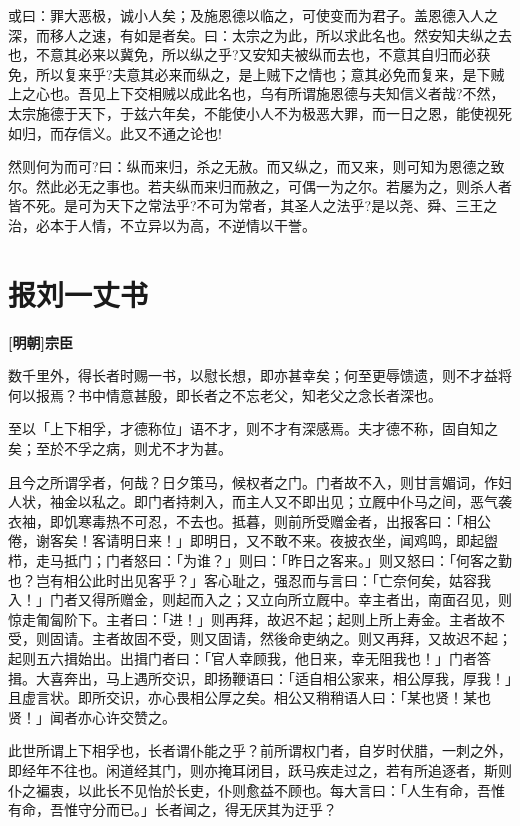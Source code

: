 \documentclass[UTF8,titlepage,oneside]{ctexbook}
\begin{document}
或曰：罪大恶极，诚小人矣；及施恩德以临之，可使变而为君子。盖恩德入人之深，而移人之速，有如是者矣。曰：太宗之为此，所以求此名也。然安知夫纵之去也，不意其必来以冀免，所以纵之乎?又安知夫被纵而去也，不意其自归而必获免，所以复来乎?夫意其必来而纵之，是上贼下之情也；意其必免而复来，是下贼上之心也。吾见上下交相贼以成此名也，乌有所谓施恩德与夫知信义者哉?不然，太宗施德于天下，于兹六年矣，不能使小人不为极恶大罪，而一日之恩，能使视死如归，而存信义。此又不通之论也!


然则何为而可?曰：纵而来归，杀之无赦。而又纵之，而又来，则可知为恩德之致尔。然此必无之事也。若夫纵而来归而赦之，可偶一为之尔。若屡为之，则杀人者皆不死。是可为天下之常法乎?不可为常者，其圣人之法乎?是以尧、舜、三王之治，必本于人情，不立异以为高，不逆情以干誉。



\chapter*{报刘一丈书}
\begin{center}
	\textbf{[明朝]宗臣}
\end{center}

数千里外，得长者时赐一书，以慰长想，即亦甚幸矣；何至更辱馈遗，则不才益将何以报焉？书中情意甚殷，即长者之不忘老父，知老父之念长者深也。

至以「上下相孚，才德称位」语不才，则不才有深感焉。夫才德不称，固自知之矣；至於不孚之病，则尤不才为甚。

且今之所谓孚者，何哉？日夕策马，候权者之门。门者故不入，则甘言媚词，作妇人状，袖金以私之。即门者持刺入，而主人又不即出见；立厩中仆马之间，恶气袭衣袖，即饥寒毒热不可忍，不去也。抵暮，则前所受赠金者，出报客曰：「相公倦，谢客矣！客请明日来！」即明日，又不敢不来。夜披衣坐，闻鸡鸣，即起盥栉，走马抵门；门者怒曰：「为谁？」则曰：「昨日之客来。」则又怒曰：「何客之勤也？岂有相公此时出见客乎？」客心耻之，强忍而与言曰：「亡奈何矣，姑容我入！」门者又得所赠金，则起而入之；又立向所立厩中。幸主者出，南面召见，则惊走匍匐阶下。主者曰：「进！」则再拜，故迟不起；起则上所上寿金。主者故不受，则固请。主者故固不受，则又固请，然後命吏纳之。则又再拜，又故迟不起；起则五六揖始出。出揖门者曰：「官人幸顾我，他日来，幸无阻我也！」门者答揖。大喜奔出，马上遇所交识，即扬鞭语曰：「适自相公家来，相公厚我，厚我！」且虚言状。即所交识，亦心畏相公厚之矣。相公又稍稍语人曰：「某也贤！某也贤！」闻者亦心许交赞之。

此世所谓上下相孚也，长者谓仆能之乎？前所谓权门者，自岁时伏腊，一刺之外，即经年不往也。闲道经其门，则亦掩耳闭目，跃马疾走过之，若有所追逐者，斯则仆之褊衷，以此长不见怡於长吏，仆则愈益不顾也。每大言曰：「人生有命，吾惟有命，吾惟守分而已。」长者闻之，得无厌其为迂乎？
\end{document}
